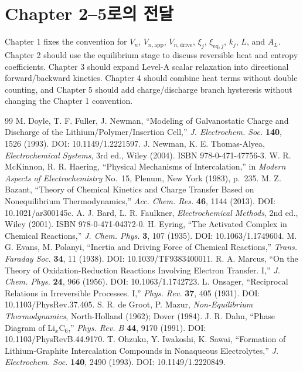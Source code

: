 \documentclass[11pt,a4paper]{article}
\newcommand{\eq}{\mathrm{eq}}
\newcommand{\app}{\mathrm{app}}
\newcommand{\drive}{\mathrm{drive}}
\begin{document}
\section*{Chapter 2--5로의 전달}
Chapter 1 fixes the convention for $V_n$, $V_{n,\app}$, $V_{n,\drive}$, $\xi_j$, $\xi_{\eq,j}$, $k_j$, $L$, and $A_L$.
Chapter 2 should use the equilibrium stage to discuss reversible heat and entropy coefficients. Chapter 3 should expand Level-A scalar
relaxation into directional forward/backward kinetics. Chapter 4 should combine heat terms without double counting, and Chapter 5 should
add charge/discharge branch hysteresis without changing the Chapter 1 convention.

\begin{thebibliography}{99}
 M. Doyle, T. F. Fuller, J. Newman, ``Modeling of Galvanostatic Charge and Discharge of the Lithium/Polymer/Insertion Cell,''
  \emph{J. Electrochem. Soc.} \textbf{140}, 1526 (1993). DOI: 10.1149/1.2221597.
 J. Newman, K. E. Thomas-Alyea, \emph{Electrochemical Systems}, 3rd ed., Wiley (2004). ISBN 978-0-471-47756-3.
 W. R. McKinnon, R. R. Haering, ``Physical Mechanisms of Intercalation,'' in \emph{Modern Aspects of Electrochemistry} No.~15, Plenum, New York (1983), p.~235.
 M. Z. Bazant, ``Theory of Chemical Kinetics and Charge Transfer Based on Nonequilibrium Thermodynamics,'' \emph{Acc. Chem. Res.} \textbf{46}, 1144 (2013). DOI: 10.1021/ar300145c.
 A. J. Bard, L. R. Faulkner, \emph{Electrochemical Methods}, 2nd ed., Wiley (2001). ISBN 978-0-471-04372-0.
 H. Eyring, ``The Activated Complex in Chemical Reactions,'' \emph{J. Chem. Phys.} \textbf{3}, 107 (1935). DOI: 10.1063/1.1749604.
 M. G. Evans, M. Polanyi, ``Inertia and Driving Force of Chemical Reactions,'' \emph{Trans. Faraday Soc.} \textbf{34}, 11 (1938). DOI: 10.1039/TF9383400011.
 R. A. Marcus, ``On the Theory of Oxidation-Reduction Reactions Involving Electron Transfer. I,'' \emph{J. Chem. Phys.} \textbf{24}, 966 (1956). DOI: 10.1063/1.1742723.
 L. Onsager, ``Reciprocal Relations in Irreversible Processes. I,'' \emph{Phys. Rev.} \textbf{37}, 405 (1931). DOI: 10.1103/PhysRev.37.405.
 S. R. de Groot, P. Mazur, \emph{Non-Equilibrium Thermodynamics}, North-Holland (1962); Dover (1984).
 J. R. Dahn, ``Phase Diagram of Li$_x$C$_6$,'' \emph{Phys. Rev. B} \textbf{44}, 9170 (1991). DOI: 10.1103/PhysRevB.44.9170.
 T. Ohzuku, Y. Iwakoshi, K. Sawai, ``Formation of Lithium-Graphite Intercalation Compounds in Nonaqueous Electrolytes,'' \emph{J. Electrochem. Soc.} \textbf{140}, 2490 (1993). DOI: 10.1149/1.2220849.

\end{thebibliography}
\end{document}
